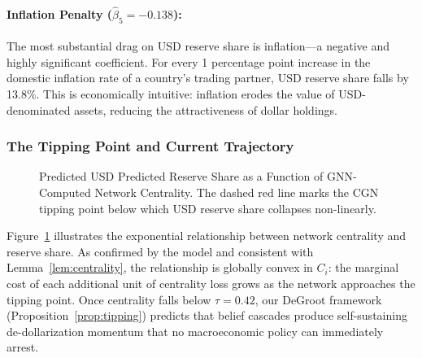 \documentclass[12pt, letterpaper]{article}
\theoremstyle{definition}
\begin{document}
\paragraph{Inflation Penalty ($\hat\beta_5 = -0.138$):}
The most substantial drag on USD reserve share is inflation---a negative and highly significant coefficient. For every 1 percentage point increase in the domestic inflation rate of a country's trading partner, USD reserve share falls by 13.8\%. This is economically intuitive: inflation erodes the value of USD-denominated assets, reducing the attractiveness of dollar holdings.

\subsubsection{The Tipping Point and Current Trajectory}

\begin{figure}[H]
\centering
{}
\caption{Predicted USD Predicted Reserve Share as a Function of GNN-Computed Network Centrality. The dashed red line marks the CGN tipping point below which USD reserve share collapses non-linearly.}
\label{fig:centrality_curve}
\end{figure}

Figure~\ref{fig:centrality_curve} illustrates the exponential relationship between network centrality and reserve share. As confirmed by the model and consistent with Lemma~\ref{lem:centrality}, the relationship is globally convex in $C_i$: the marginal cost of each additional unit of centrality loss grows as the network approaches the tipping point. Once centrality falls below $\tau = 0.42$, our DeGroot framework (Proposition~\ref{prop:tipping}) predicts that belief cascades produce self-sustaining de-dollarization momentum that no macroeconomic policy can immediately arrest.
\end{document}

